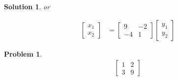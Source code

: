 \documentclass{article}
\newtheorem{problem}{Problem}
\newtheorem*{solution}{Solution}
\begin{document}
\begin{solution}
or 

\begin{align*}
\begin{bmatrix} x_{1} \\ x_{2} \end{bmatrix}
&= 
\begin{bmatrix}
9 & -2 \\ -4 & 1
\end{bmatrix} 
\begin{bmatrix}
y_{1} \\ y_{2}
\end{bmatrix}
\end{align*}

\end{solution}

\begin{problem}
\begin{align*}
\begin{bmatrix}
1 & 2 \\ 3 & 9
\end{bmatrix}
\end{align*}
\end{problem}
\end{document}
